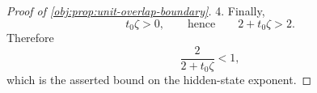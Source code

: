 \begin{proof}[Proof of \cref{obj:prop:unit-overlap-boundary}]
4. Finally,
\[
t_0\zeta>0,
\qquad\text{hence}\qquad
2+t_0\zeta>2.
\]
Therefore
\[
\frac{2}{2+t_0\zeta}<1,
\]
which is the asserted bound on the hidden-state exponent. %
\end{proof}
